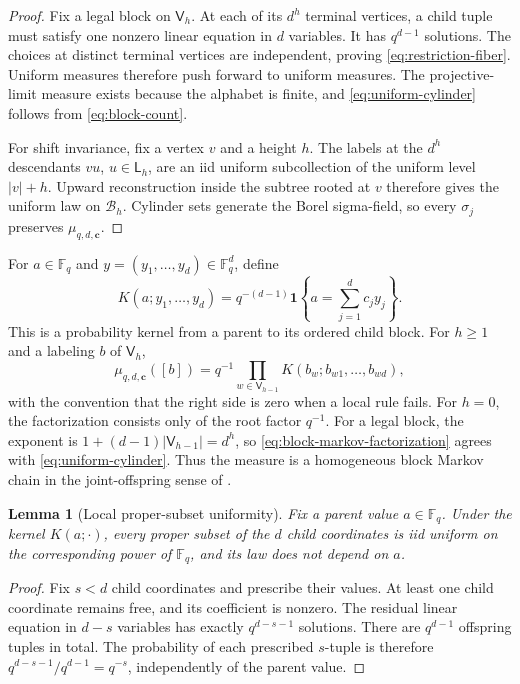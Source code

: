 \documentclass[11pt,a4paper]{amsart}
\newtheorem{lemma}[theorem]{Lemma}
\theoremstyle{definition}
\theoremstyle{remark}
\newcommand{\F}{\mathbb F}
\newcommand{\cB}{\mathcal B}
\newcommand{\Lev}{\mathsf L}
\newcommand{\Vol}{\mathsf V}
\begin{document}
\begin{proof}
Fix a legal block on $\Vol_h$.  At each of its $d^h$ terminal vertices, a
child tuple must satisfy one nonzero linear equation in $d$ variables.  It
has $q^{d-1}$ solutions.  The choices at distinct terminal vertices are
independent, proving \eqref{eq:restriction-fiber}.  Uniform measures
therefore push forward to uniform measures.  The projective-limit measure
exists because the alphabet is finite, and \eqref{eq:uniform-cylinder}
follows from \eqref{eq:block-count}.

For shift invariance, fix a vertex $v$ and a height $h$.  The labels at the
$d^h$ descendants $vu$, $u\in\Lev_h$, are an iid uniform subcollection of
the uniform level $|v|+h$.  Upward reconstruction inside the subtree rooted
at $v$ therefore gives the uniform law on $\cB_h$.  Cylinder sets generate
the Borel sigma-field, so every $\sigma_j$ preserves $\mu_{q,d,\boldsymbol c}$.
\end{proof}

For $a\in\F_q$ and $y=(y_1,\ldots,y_d)\in\F_q^d$, define
\begin{equation}\label{eq:offspring-kernel}
 K(a;y_1,\ldots,y_d)
 =q^{-(d-1)}\mathbf 1
   \left\{a=\sum_{j=1}^dc_jy_j\right\}.
\end{equation}
This is a probability kernel from a parent to its ordered child block.  For
$h\geq1$ and a labeling $b$ of $\Vol_h$,
\begin{equation}\label{eq:block-markov-factorization}
 \mu_{q,d,\boldsymbol c}([b])
 =q^{-1}\prod_{w\in\Vol_{h-1}}
 K(b_w;b_{w1},\ldots,b_{wd}),
\end{equation}
with the convention that the right side is zero when a local rule fails.
For $h=0$, the factorization consists only of the root factor $q^{-1}$.
For a legal block, the exponent is
$1+(d-1)|\Vol_{h-1}|=d^h$, so
\eqref{eq:block-markov-factorization} agrees with
\eqref{eq:uniform-cylinder}.  Thus the measure is a homogeneous block
Markov chain in the joint-offspring sense of \cite{Souissi2022}.

\begin{lemma}[Local proper-subset uniformity]\label{lem:local-uniform}
Fix a parent value $a\in\F_q$.  Under the kernel $K(a;\cdot)$, every proper
subset of the $d$ child coordinates is iid uniform on the corresponding
power of $\F_q$, and its law does not depend on $a$.
\end{lemma}

\begin{proof}
Fix $s<d$ child coordinates and prescribe their values.  At least one child
coordinate remains free, and its coefficient is nonzero.  The residual
linear equation in $d-s$ variables has exactly $q^{d-s-1}$ solutions.
There are $q^{d-1}$ offspring tuples in total.  The probability of each
prescribed $s$-tuple is therefore $q^{d-s-1}/q^{d-1}=q^{-s}$, independently
of the parent value.
\end{proof}
\end{document}
